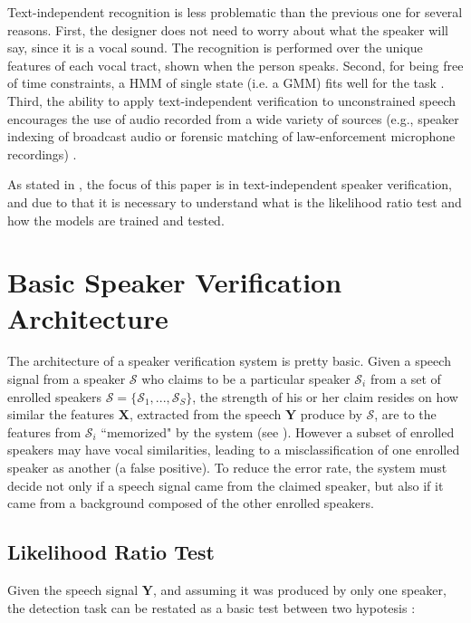 Text-independent recognition is less problematic than the previous one for several reasons. First, the designer does not need to worry about what the speaker will say, since it is a vocal sound. The recognition is performed over the unique features of each vocal tract, shown when the person speaks. Second, for being free of time constraints, a HMM of single state (i.e. a GMM) fits well for the task \cite{hebert.2008}. Third, the ability to apply text-independent verification to unconstrained speech encourages the use of audio recorded from a wide variety of sources (e.g., speaker indexing of broadcast audio or forensic matching of law-enforcement microphone recordings) \cite{reynolds.campbell.2008}.

As stated in , the focus of this paper is in text-independent speaker verification, and due to that it is necessary to understand what is the likelihood ratio test and how the models are trained and tested.

\section{Basic Speaker Verification Architecture}

The architecture of a speaker verification system is pretty basic. Given a speech signal from a speaker $\mathcal{S}$ who claims to be a particular speaker $\mathcal{S}_i$ from a set of enrolled speakers $\boldsymbol{\mathcal{S}} = \{\mathcal{S}_1, ..., \mathcal{S}_S\}$, the strength of his or her claim resides on how similar the features $\boldsymbol{X}$, extracted from the speech $\boldsymbol{Y}$ produce by $\mathcal{S}$, are to the features from $\mathcal{S}_i$ ``memorized" by the system (see ). However a subset of enrolled speakers may have vocal similarities, leading to a misclassification of one enrolled speaker as another (a false positive). To reduce the error rate, the system must decide not only if a speech signal came from the claimed speaker, but also if it came from a background composed of the other enrolled speakers.

\subsection{Likelihood Ratio Test}

Given the speech signal $\boldsymbol{Y}$, and assuming it was produced by only one speaker, the detection task can be restated as a basic test between two hypotesis \cite{reynolds.1995b}:

